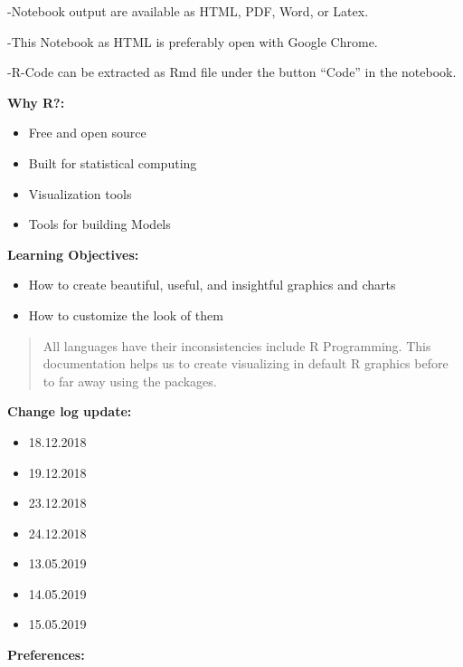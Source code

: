 \documentclass[]{book}
\providecommand{\tightlist}{%
  \setlength{\itemsep}{0pt}\setlength{\parskip}{0pt}}
\begin{document}
-Notebook output are available as HTML, PDF, Word, or Latex.

-This Notebook as HTML is preferably open with Google Chrome.

-R-Code can be extracted as Rmd file under the button ``Code'' in the
notebook.

\textbf{Why R?: }

\begin{itemize}
\item
  Free and open source
\item
  Built for statistical computing
\item
  Visualization tools
\item
  Tools for building Models
\end{itemize}

\textbf{Learning Objectives:}

\begin{itemize}
\item
  How to create beautiful, useful, and insightful graphics and charts
\item
  How to customize the look of them
\end{itemize}

\begin{quote}
All languages have their inconsistencies include R Programming. This
documentation helps us to create visualizing in default R graphics
before to far away using the packages.
\end{quote}

\textbf{Change log update: }

\begin{itemize}
\tightlist
\item
  18.12.2018
\item
  19.12.2018
\item
  23.12.2018
\item
  24.12.2018
\item
  13.05.2019
\item
  14.05.2019
\item
  15.05.2019
\end{itemize}

\textbf{Preferences: }
\end{document}
